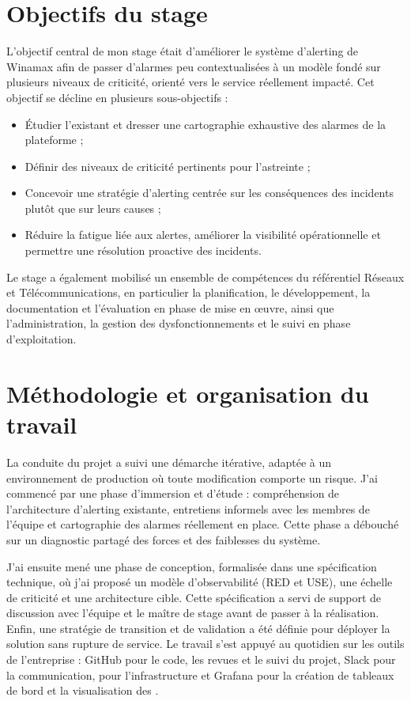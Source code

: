 \section{Objectifs du stage}

L'objectif central de mon stage était d'améliorer le système d'alerting de Winamax afin de passer
d'alarmes peu contextualisées à un modèle fondé sur plusieurs niveaux de criticité, orienté vers le
service réellement impacté. Cet objectif se décline en plusieurs sous-objectifs :

\begin{itemize}
	\item Étudier l'existant et dresser une cartographie exhaustive des alarmes de la plateforme ;
	\item Définir des niveaux de criticité pertinents pour l'astreinte ;
	\item Concevoir une stratégie d'alerting centrée sur les conséquences des incidents plutôt que sur leurs causes ;
	\item Réduire la fatigue liée aux alertes, améliorer la visibilité opérationnelle et permettre une résolution proactive des incidents.
\end{itemize}

Le stage a également mobilisé un ensemble de compétences du référentiel Réseaux et
Télécommunications, en particulier la planification, le développement, la documentation et
l'évaluation en phase de mise en œuvre, ainsi que l'administration, la gestion des dysfonctionnements
et le suivi en phase d'exploitation.

\section{Méthodologie et organisation du travail}

La conduite du projet a suivi une démarche itérative, adaptée à un environnement de production où
toute modification comporte un risque. J'ai commencé par une phase d'immersion et d'étude :
compréhension de l'architecture d'alerting existante, entretiens informels avec les membres de l'équipe et cartographie des alarmes réellement en place.
Cette phase a débouché sur un diagnostic partagé des forces et des faiblesses du système.

J'ai ensuite mené une phase de conception, formalisée dans une spécification technique, où j'ai
proposé un modèle d'observabilité (RED et USE), une échelle de criticité et une architecture cible.
Cette spécification a servi de support de discussion avec l'équipe et le maître de stage avant de passer
à la réalisation. Enfin, une stratégie de transition et de validation a été définie pour déployer la solution sans rupture de service. Le travail s'est appuyé au
quotidien sur les outils de l'entreprise : GitHub pour le code, les revues et le suivi du projet, Slack pour la communication,
 pour l'infrastructure et Grafana pour la création de tableaux de bord et la visualisation des .
